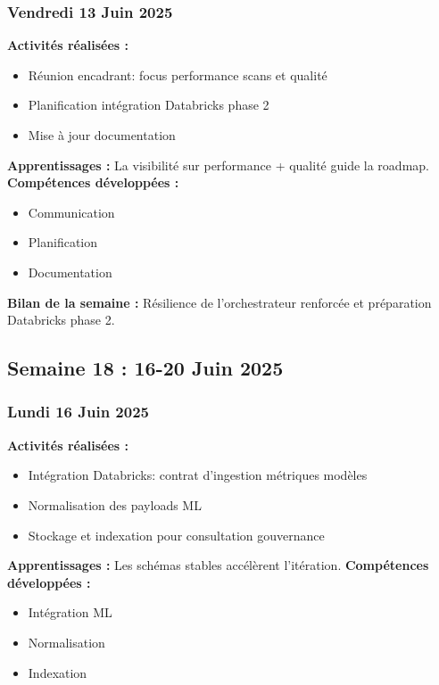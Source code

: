 \documentclass[12pt,a4paper]{article}
\begin{document}
\subsubsection{Vendredi 13 Juin 2025}
\textbf{Activités réalisées :}
\begin{itemize}
    \item Réunion encadrant: focus performance scans et qualité
    \item Planification intégration Databricks phase 2
    \item Mise à jour documentation
\end{itemize}
\textbf{Apprentissages :} La visibilité sur performance + qualité guide la roadmap.
\textbf{Compétences développées :}
\begin{itemize}
    \item Communication
    \item Planification
    \item Documentation
\end{itemize}
\textbf{Bilan de la semaine :} Résilience de l'orchestrateur renforcée et préparation Databricks phase 2.

\clearpage
\subsection{Semaine 18 : 16-20 Juin 2025}

\subsubsection{Lundi 16 Juin 2025}
\textbf{Activités réalisées :}
\begin{itemize}
    \item Intégration Databricks: contrat d'ingestion métriques modèles
    \item Normalisation des payloads ML
    \item Stockage et indexation pour consultation gouvernance
\end{itemize}
\textbf{Apprentissages :} Les schémas stables accélèrent l'itération.
\textbf{Compétences développées :}
\begin{itemize}
    \item Intégration ML
    \item Normalisation
    \item Indexation
\end{itemize}
\end{document}
